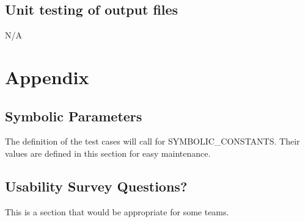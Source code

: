 \documentclass[12pt, titlepage]{article}
\begin{document}
		
\subsection{Unit testing of output files}		
N/A






\newpage

\section{Appendix}

\subsection{Symbolic Parameters}

The definition of the test cases will call for SYMBOLIC\_CONSTANTS.
Their values are defined in this section for easy maintenance.

\subsection{Usability Survey Questions?}

This is a section that would be appropriate for some teams.
\end{document}
